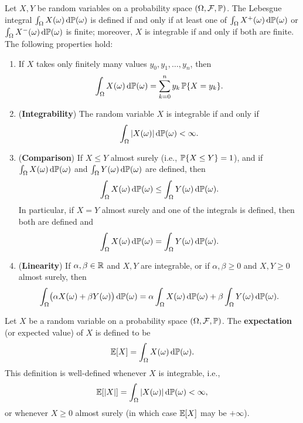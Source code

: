 \begin{proposition}\label{prop:lebesgue-props}
Let $X, Y$ be random variables on a probability space $(\Omega, \mathcal{F}, \mathbb{P})$. The Lebesgue integral $\int_{\Omega} X(\omega)\,\mathrm{d}\mathbb{P}(\omega)$ is defined if and only if at least one of $\int_{\Omega} X^{+}(\omega)\,\mathrm{d}\mathbb{P}(\omega)$ or $\int_{\Omega} X^{-}(\omega)\,\mathrm{d}\mathbb{P}(\omega)$ is finite; moreover, $X$ is integrable if and only if both are finite. The following properties hold:
\begin{enumerate}
    \item If $X$ takes only finitely many values $y_0, y_1, \ldots, y_n$, then
    \[
    \int_{\Omega} X(\omega)\,\mathrm{d}\mathbb{P}(\omega) = \sum_{k=0}^n y_k\,\mathbb{P}\{X = y_k\}.
    \]
    \item (\textbf{Integrability}) The random variable $X$ is integrable if and only if
    \[
    \int_{\Omega} |X(\omega)|\,\mathrm{d}\mathbb{P}(\omega) < \infty.
    \]
    \item (\textbf{Comparison}) If $X \leq Y$ almost surely (i.e., $\mathbb{P}\{X \leq Y\} = 1$), and if $\int_{\Omega} X(\omega)\,\mathrm{d}\mathbb{P}(\omega)$ and $\int_{\Omega} Y(\omega)\,\mathrm{d}\mathbb{P}(\omega)$ are defined, then
    \[
    \int_{\Omega} X(\omega)\,\mathrm{d}\mathbb{P}(\omega) \leq \int_{\Omega} Y(\omega)\,\mathrm{d}\mathbb{P}(\omega).
    \]
    In particular, if $X = Y$ almost surely and one of the integrals is defined, then both are defined and
    \[
    \int_{\Omega} X(\omega)\,\mathrm{d}\mathbb{P}(\omega) = \int_{\Omega} Y(\omega)\,\mathrm{d}\mathbb{P}(\omega).
    \]
    \item (\textbf{Linearity}) If $\alpha, \beta \in \mathbb{R}$ and $X, Y$ are integrable, or if $\alpha, \beta \geq 0$ and $X, Y \geq 0$ almost surely, then
    \[
    \int_{\Omega} \bigl(\alpha X(\omega) + \beta Y(\omega)\bigr)\,\mathrm{d}\mathbb{P}(\omega) = \alpha \int_{\Omega} X(\omega)\,\mathrm{d}\mathbb{P}(\omega) + \beta \int_{\Omega} Y(\omega)\,\mathrm{d}\mathbb{P}(\omega).
    \]
\end{enumerate}
\end{proposition}

\begin{definition}\label{def:expectation}
    Let $X$ be a random variable on a probability space $(\Omega, \mathcal{F}, \mathbb{P})$. The \textbf{expectation} (or expected value) of $X$ is defined to be
    \[
    \mathbb{E}[X] = \int_{\Omega} X(\omega)\,\mathrm{d}\mathbb{P}(\omega).
    \]
    This definition is well-defined whenever $X$ is integrable, i.e.,
    \[
    \mathbb{E}[|X|] = \int_{\Omega} |X(\omega)|\,\mathrm{d}\mathbb{P}(\omega) < \infty,
    \]
    or whenever $X \geq 0$ almost surely (in which case $\mathbb{E}[X]$ may be $+\infty$).
\end{definition}

